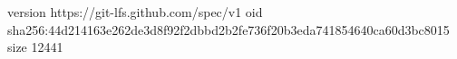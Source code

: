 version https://git-lfs.github.com/spec/v1
oid sha256:44d214163e262de3d8f92f2dbbd2b2fe736f20b3eda741854640ca60d3bc8015
size 12441
